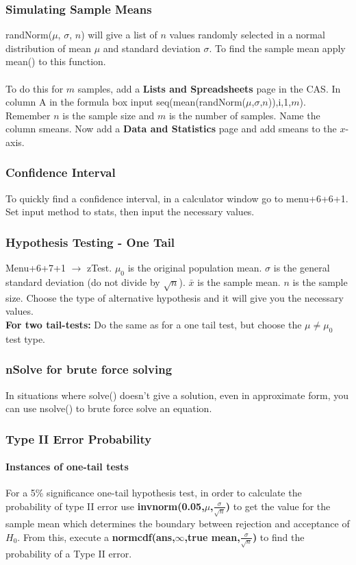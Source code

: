 \documentclass[a4paper,twoside]{article}
\begin{document}
			\subsubsection{Simulating Sample Means}
				randNorm($\mu$, $\sigma$, $n$) will give a list of $n$ values randomly selected in a normal distribution of mean $\mu$ and standard deviation $\sigma$. To find the sample mean apply mean() to this function.\\\\
				To do this for $m$ samples, add a \textbf{Lists and Spreadsheets} page in the CAS. In column A in the formula box input seq(mean(randNorm($\mu$,$\sigma$,$n$)),i,1,$m$). Remember $n$ is the sample size and $m$ is the number of samples. Name the column smeans. Now add a \textbf{Data and Statistics} page and add smeans to the $x$-axis.
			\subsubsection{Confidence Interval}
				To quickly find a confidence interval, in a calculator window go to menu+6+6+1. Set input method to stats, then input the necessary values.
			\subsubsection{Hypothesis Testing - One Tail}
				Menu+6+7+1 $\to$ zTest. $\mu_0$ is the original population mean. $\sigma$ is the general standard deviation (do not divide by $\sqrt{n}$). $\bar{x}$ is the sample mean. $n$ is the sample size. Choose the type of alternative hypothesis and it will give you the necessary values.\\
				\textbf{For two tail-tests:} Do the same as for a one tail test, but choose the $\mu\neq\mu_0$ test type.
			\subsubsection{nSolve for brute force solving}
				In situations where solve() doesn't give a solution, even in approximate form, you can use nsolve() to brute force solve an equation.
				
			\subsubsection{Type II Error Probability}
				\paragraph{Instances of one-tail tests} For a 5\% significance one-tail hypothesis test, in order to calculate the probability of type II error use \textbf{invnorm(0.05,$\mu$,$\frac{\sigma}{\sqrt{n}}$)} to get the value for the sample mean which determines the boundary between rejection and acceptance of $H_0$. From this, execute a \textbf{normcdf(ans,$\infty$,true mean,$\frac{\sigma}{\sqrt{n}}$)} to find the probability of a Type II error.
				
\end{document}
